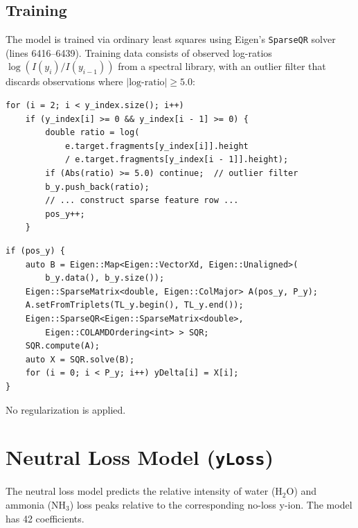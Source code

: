 \documentclass[11pt,a4paper]{article}
\begin{document}
\subsection{Training}

The model is trained via ordinary least squares using Eigen's \texttt{SparseQR} solver (lines 6416--6439). Training data consists of observed log-ratios $\log(I(y_i) / I(y_{i-1}))$ from a spectral library, with an outlier filter that discards observations where $|\text{log-ratio}| \geq 5.0$:

\begin{lstlisting}[caption={Training data construction (lines 6416--6430)}]
for (i = 2; i < y_index.size(); i++)
    if (y_index[i] >= 0 && y_index[i - 1] >= 0) {
        double ratio = log(
            e.target.fragments[y_index[i]].height
            / e.target.fragments[y_index[i - 1]].height);
        if (Abs(ratio) >= 5.0) continue;  // outlier filter
        b_y.push_back(ratio);
        // ... construct sparse feature row ...
        pos_y++;
    }
\end{lstlisting}

\begin{lstlisting}[caption={SparseQR solve (lines 6432--6439)}]
if (pos_y) {
    auto B = Eigen::Map<Eigen::VectorXd, Eigen::Unaligned>(
        b_y.data(), b_y.size());
    Eigen::SparseMatrix<double, Eigen::ColMajor> A(pos_y, P_y);
    A.setFromTriplets(TL_y.begin(), TL_y.end());
    Eigen::SparseQR<Eigen::SparseMatrix<double>,
        Eigen::COLAMDOrdering<int> > SQR;
    SQR.compute(A);
    auto X = SQR.solve(B);
    for (i = 0; i < P_y; i++) yDelta[i] = X[i];
}
\end{lstlisting}

No regularization is applied.

\section{Neutral Loss Model (\texttt{yLoss})}
\label{sec:yloss}

The neutral loss model predicts the relative intensity of water ($\text{H}_2\text{O}$) and ammonia ($\text{NH}_3$) loss peaks relative to the corresponding no-loss y-ion. The model has 42 coefficients.
\end{document}
